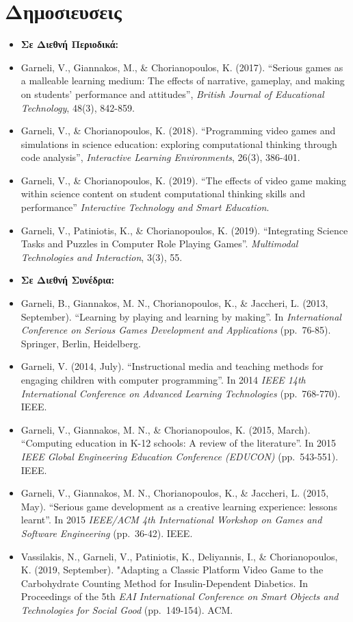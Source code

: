 \documentclass[%
    11pt,
  oneside
  ]{memoir}
\let\oldsection\section
\renewcommand{\section}[1]{%
  \oldsection{#1}
  \leavevmode
  \par
  \vspace{\dimexpr-\baselineskip-\parskip}
}
\begin{document}
\hypertarget{ux3b4ux3b7ux3bcux3bfux3c3ux3b9ux3b5ux3c5ux3c3ux3b5ux3b9ux3c2}{%
\section{Δημοσιευσεις}\label{ux3b4ux3b7ux3bcux3bfux3c3ux3b9ux3b5ux3c5ux3c3ux3b5ux3b9ux3c2}}

\begin{itemize}
\item
  \textbf{Σε Διεθνή Περιοδικά:}
\item
  Garneli, V., Giannakos, M., \& Chorianopoulos, K. (2017). ``Serious
  games as a malleable learning medium: The effects of narrative,
  gameplay, and making on students' performance and attitudes'',
  \emph{British Journal of Educational Technology}, 48(3), 842-859.
\item
  Garneli, V., \& Chorianopoulos, K. (2018). ``Programming video games
  and simulations in science education: exploring computational thinking
  through code analysis'', \emph{Interactive Learning Environments},
  26(3), 386-401.
\item
  Garneli, V., \& Chorianopoulos, K. (2019). ``The effects of video game
  making within science content on student computational thinking skills
  and performance'' \emph{Interactive Technology and Smart Education}.
\item
  Garneli, V., Patiniotis, K., \& Chorianopoulos, K. (2019).
  ``Integrating Science Tasks and Puzzles in Computer Role Playing
  Games''. \emph{Multimodal Technologies and Interaction}, 3(3), 55.
\item
  \textbf{Σε Διεθνή Συνέδρια:}
\item
  Garneli, B., Giannakos, M. N., Chorianopoulos, K., \& Jaccheri, L.
  (2013, September). ``Learning by playing and learning by making''. In
  \emph{International Conference on Serious Games Development and
  Applications} (pp.~76-85). Springer, Berlin, Heidelberg.
\item
  Garneli, V. (2014, July). ``Instructional media and teaching methods
  for engaging children with computer programming''. In 2014 \emph{IEEE
  14th International Conference on Advanced Learning Technologies}
  (pp.~768-770). IEEE.
\item
  Garneli, V., Giannakos, M. N., \& Chorianopoulos, K. (2015, March).
  ``Computing education in K-12 schools: A review of the literature''.
  In 2015 \emph{IEEE Global Engineering Education Conference (EDUCON)}
  (pp.~543-551). IEEE.
\item
  Garneli, V., Giannakos, M. N., Chorianopoulos, K., \& Jaccheri, L.
  (2015, May). ``Serious game development as a creative learning
  experience: lessons learnt''. In 2015 \emph{IEEE/ACM 4th International
  Workshop on Games and Software Engineering} (pp.~36-42). IEEE.
\item
  Vassilakis, N., Garneli, V., Patiniotis, K., Deliyannis, I., \&
  Chorianopoulos, K. (2019, September). "Adapting a Classic Platform
  Video Game to the Carbohydrate Counting Method for Insulin-Dependent
  Diabetics. In Proceedings of the 5th \emph{EAI International
  Conference on Smart Objects and Technologies for Social Good}
  (pp.~149-154). ACM.
\end{itemize}
\end{document}
